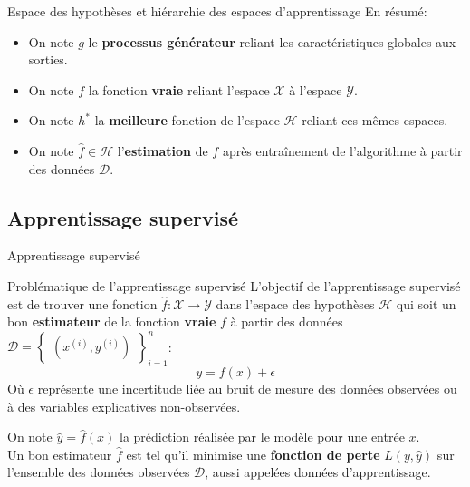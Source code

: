 \documentclass[10pt]{beamer}  %
\begin{document}
\begin{frame}{Espace des hypothèses et hiérarchie des espaces d'apprentissage}
	En résumé:
	\begin{itemize}
		\item On note $g$ le \textbf{processus générateur} reliant les caractéristiques globales aux sorties.
		\item On note $f$ la fonction \textbf{vraie} reliant l'espace $\mathcal{X}$ à l'espace $\mathcal{Y}$.
		\item On note $h^*$ la \textbf{meilleure} fonction de l'espace $\mathcal{H}$ reliant ces mêmes espaces.
		\item On note $\hat{f} \in \mathcal{H}$ l'\textbf{estimation} de $f$ après entraînement de l'algorithme à partir des données $\mathcal{D}$.
	\end{itemize}
\end{frame}

\subsection[Apprentissage supervisé]{Apprentissage supervisé}

\begin{frame}{Apprentissage supervisé}
	\begin{block}{Problématique de l'apprentissage supervisé}
		L'objectif de l'apprentissage supervisé est de trouver une fonction $\hat{f}: \mathcal{X} \to \mathcal{Y}$ dans l'espace des hypothèses $\mathcal{H}$ qui soit un bon \textbf{estimateur} de la fonction \textbf{vraie} $f$ à partir des données $\mathcal{D} = \begin{Bmatrix}(x^{(i)}, y^{(i)})\end{Bmatrix}_{i=1}^n$:
		\begin{equation}
			y = f(x) + \epsilon
			\nonumber
		\end{equation}
		Où $\epsilon$ représente une incertitude liée au bruit de mesure des données observées ou à des variables explicatives non-observées.
		\hfill
	\end{block}
	\vspace{0.5cm}
	\pause
	On note $\hat{y} = \hat{f}(x)$ la prédiction réalisée par le modèle pour une entrée $x$. \\
	\vspace{0.5cm}
	\pause
	Un bon estimateur $\hat{f}$ est tel qu'il minimise une \textbf{fonction de perte} $L(y, \hat{y})$ sur l'ensemble des données observées $\mathcal{D}$, aussi appelées données d'apprentissage.
\end{frame}
\end{document}
